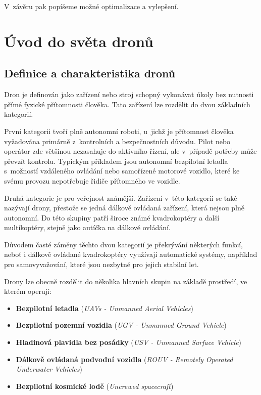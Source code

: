 \documentclass[12pt]{report}
\begin{document}
V~závěru pak popíšeme možné optimalizace a vylepšení.
\part[Úvod do světa dronů]{Úvod do světa dronů}  %

\chapter[Definice a charakteristika dronů]{Definice a charakteristika dronů}

Dron je definován jako zařízení nebo stroj schopný vykonávat úkoly bez nutnosti přímé fyzické přítomnosti člověka. Tato zařízení lze rozdělit do dvou základních kategorií.

První kategorii tvoří plně autonomní roboti, u~jichž je přítomnost člověka vyžadována primárně z~kontrolních a bezpečnostních důvodu. Pilot nebo operátor zde většinou nezasahuje do aktivního řízení, ale v~případě potřeby může převzít kontrolu. Typickým příkladem jsou autonomní bezpilotní letadla s~možností vzdáleného ovládání nebo samořízené motorové vozidlo, které ke svému provozu nepotřebuje řidiče přítomného ve vozidle.

Druhá kategorie je pro veřejnost známější. Zařízení v~této kategorii se také nazývají drony, přestože se jedná dálkově ovládaná zařízení, která nejsou plně autonomní. Do této skupiny patří široce známé kvadrokoptéry a další multikoptéry, stejně jako autíčka na dálkové ovládání.

Důvodem časté záměny těchto dvou kategorií je překrývání některých funkcí, neboť i dálkově ovládané kvadrokoptéry využívají automatické systémy, například pro samovyvažování, které jsou nezbytné pro jejich stabilní let.\cite{mainbook}

Drony lze obecně rozdělit do několika hlavních skupin na základě prostředí, ve kterém operují:
\begin{itemize}
	\item \textbf{Bezpilotní letadla} (\textit{UAVs - Unmanned Aerial Vehicles})
	\item \textbf{Bezpilotní pozemní vozidla} (\textit{UGV - Unmanned Ground Vehicle})
	\item \textbf{Hladinová plavidla bez posádky} (\textit{USV - Unmanned Surface Vehicle})
	\item \textbf{Dálkově ovládaná podvodní vozidla} (\textit{ROUV - Remotely Operated Underwater Vehicles})
	\item \textbf{Bezpilotní kosmické lodě} (\textit{Uncrewed spacecraft})
\end{itemize}
\end{document}
